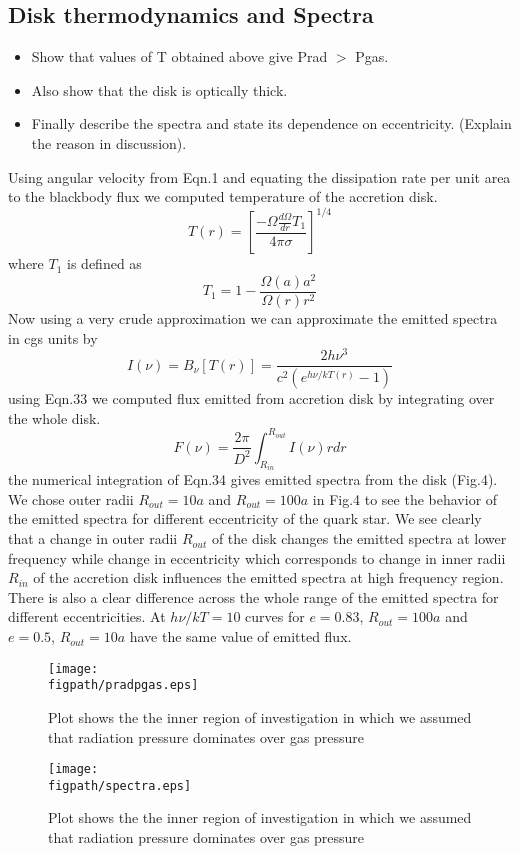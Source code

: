 \documentclass[useAMS,usenatbib]{mn2e}
\newcommand{\figpath}{./Figs/}
\begin{document}
\subsection{Disk thermodynamics and Spectra}
\begin{itemize}
\item Show that values of T obtained above give Prad $>$ Pgas. 
\item Also show that the disk is optically thick.
\item Finally describe the spectra and state its dependence on
  eccentricity. (Explain the reason in discussion).
\end{itemize}
Using angular velocity from Eqn.1 and equating the dissipation rate per unit area to the blackbody flux we computed temperature of the accretion disk.
\begin{equation}
T(r) = \left[\frac{-\Omega\frac{d\Omega}{dr}T_1}{4\pi\sigma}\right]^{1/4}
\end{equation}
where $T_1$ is defined as
\begin{equation}
T_1 = 1 - \frac{\Omega(a)a^2}{\Omega(r)r^2}
\end{equation}
Now using a very crude approximation we can approximate the emitted spectra in cgs units by
\begin{equation}
I(\nu) = B_{\nu}[T(r)] = \frac{2h\nu^3}{c^2(e^{h\nu/kT(r)} -1)}
\end{equation}
using Eqn.33 we computed flux emitted from accretion disk by integrating over the whole disk.
\begin{equation}
F(\nu) = \frac{2\pi}{D^2}\int^{R_{out}}_{R_{in}}I(\nu)rdr
\end{equation}
the numerical integration of Eqn.34 gives emitted spectra from the disk (Fig.4). We chose outer radii $R_{out} = 10a$ and $R_{out} = 100a$ in Fig.4 to see the behavior of the emitted spectra for different eccentricity of the quark star. We see clearly that a change in outer radii $R_{out}$ of the disk changes the emitted spectra at lower frequency while change in eccentricity which corresponds to change in inner radii $R_{in}$ of the accretion disk influences the emitted spectra at high frequency region. There is also a clear difference across the whole range of the emitted spectra for different eccentricities. At $h\nu/kT = 10$ curves for $e = 0.83$, $R_{out} = 100a$ and $e = 0.5$, $R_{out} = 10a$ have the same value of emitted flux.
\begin{figure}
\centering
\texttt{[image: \\figpath/pradpgas.eps]}
\caption{Plot shows the the inner region of investigation in which we assumed that radiation pressure dominates over gas pressure}
\label{fig:steadyplt1}
\end{figure}
\begin{figure}
\centering
\texttt{[image: \\figpath/spectra.eps]}
\caption{Plot shows the the inner region of investigation in which we assumed that radiation pressure dominates over gas pressure}
\label{fig:steadyplt1}
\end{figure}
\end{document}
